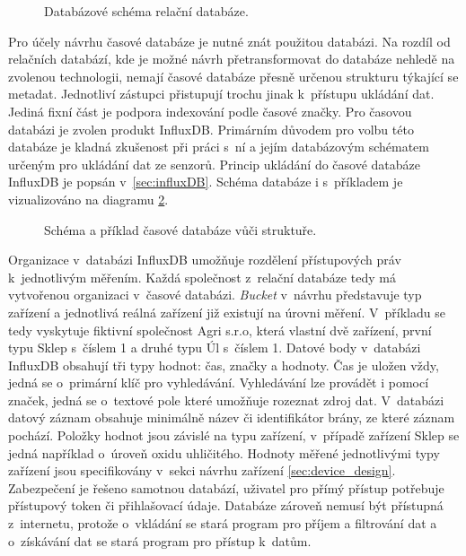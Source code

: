 \begin{figure}[ht]
  \centering
  
  \caption{Databázové schéma relační databáze.}
  \label{dia:relation_database}
\end{figure}

Pro účely návrhu časové databáze je nutné znát použitou databázi. Na rozdíl od relačních databází, kde je možné návrh přetransformovat do databáze nehledě na zvolenou technologii, nemají časové databáze přesně určenou strukturu týkající se metadat. Jednotliví zástupci přistupují trochu jinak k~přístupu ukládání dat. Jediná fixní část je podpora indexování podle časové značky. Pro časovou databázi je zvolen produkt InfluxDB. Primárním důvodem pro volbu této databáze je kladná zkušenost při práci s~ní a jejím databázovým schématem určeným pro ukládání dat ze senzorů. Princip ukládání do časové databáze InfluxDB je popsán v~\ref{sec:influxDB}. Schéma databáze i s~příkladem je vizualizováno na diagramu \ref{dia:influxdb}.

\begin{figure}[ht]
  \centering
  
  \caption{Schéma a příklad časové databáze vůči struktuře.}
  \label{dia:influxdb}
\end{figure}

Organizace v~databázi InfluxDB umožňuje rozdělení přístupových práv k~jednotlivým měřením. Každá společnost z~relační databáze tedy má vytvořenou organizaci v~časové databázi. \textit{Bucket} v~návrhu představuje typ zařízení a jednotlivá reálná zařízení již existují na úrovni měření. V~příkladu se tedy vyskytuje fiktivní společnost Agri s.r.o, která vlastní dvě zařízení, první typu Sklep s~číslem 1 a druhé typu Úl s~číslem 1. Datové body v~databázi InfluxDB obsahují tři typy hodnot: čas, značky a hodnoty. Čas je uložen vždy, jedná se o~primární klíč pro vyhledávání. Vyhledávání lze provádět i pomocí značek, jedná se o~textové pole které umožňuje rozeznat zdroj dat. V~databázi datový záznam obsahuje minimálně název či identifikátor brány, ze které záznam pochází. Položky hodnot jsou závislé na typu zařízení, v~případě zařízení Sklep se jedná například o~úroveň oxidu uhličitého. Hodnoty měřené jednotlivými typy zařízení jsou specifikovány v~sekci návrhu zařízení \ref{sec:device_design}. Zabezpečení je řešeno samotnou databází, uživatel pro přímý přístup potřebuje přístupový token či přihlašovací údaje. Databáze zároveň nemusí být přístupná z~internetu, protože o~vkládání se stará program pro příjem a filtrování dat a o~získávání dat se stará program pro přístup k~datům.

